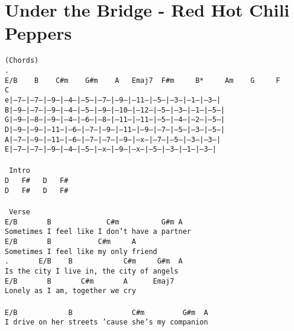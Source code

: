\newpage
\section{Under the Bridge - Red Hot Chili Peppers}
\label{Under the Bridge - Red Hot Chili Peppers}
\texttt{(Chords)\\
. E/B\ \ \ \ B\ \ \ \ C\#m\ \ \ \ G\#m\ \ \ \ A\ \ \ Emaj7\ \ F\#m\ \ \ \ \ B*\ \ \ \ \ Am\ \ \ \ G\ \ \ \ \ F\ \ \ \ \ C\\
e|--7--|--7--|--9---|--4--|--5--|--7--|--9---|--11--|--5--|--3--|--1--|--3--|\\
B|--9--|--7--|--9---|--4--|--5--|--9--|--10--|--12--|--5--|--3--|--1--|--5--|\\
G|--9--|--8--|--9---|--4--|--6--|--8--|--11--|--11--|--5--|--4--|--2--|--5--|\\
D|--9--|--9--|--11--|--6--|--7--|--9--|--11--|--9---|--7--|--5--|--3--|--5--|\\
A|--7--|--9--|--11--|--6--|--7--|--7--|--9---|--x---|--7--|--5--|--3--|--3--|\\
E|--7--|--7--|--9---|--4--|--5--|--x--|--9---|--x---|--5--|--3--|--1--|--3--|\\
\\
\lbrack\ Intro\rbrack\\
D\ \ \ F\#\ \ \ D\ \ \ F\#\\
D\ \ \ F\#\ \ \ D\ \ \ F\#\\
\\
\lbrack\ Verse\rbrack\\
E/B\ \ \ \ \ \ \ B\ \ \ \ \ \ \ \ \ \ \ \ \ C\#m\ \ \ \ \ \ \ \ \ \ G\#m\ A\\
Sometimes\ I\ feel\ like\ I\ don't\ have\ a\ partner\\
E/B\ \ \ \ \ \ \ B\ \ \ \ \ \ \ \ \ \ \ C\#m\ \ \ \ \ A\\
Sometimes\ I\ feel\ like\ my\ only\ friend\\
. \ \ \ \ \ \ E/B\ \ \ \ B\ \ \ \ \ \ \ \ \ \ \ \ C\#m\ \ \ \ \ G\#m\ \ A\\
Is\ the\ city\ I\ live\ in,\ the\ city\ of\ angels\\
E/B\ \ \ \ \ \ \ B\ \ \ \ \ \ \ C\#m\ \ \ \ \ \ \ A\ \ \ \ \ \ Emaj7\\
Lonely\ as\ I\ am,\ together\ we\ cry\\
\\
E/B\ \ \ \ \ \ \ \ \ \ \ \ B\ \ \ \ \ \ \ \ \ \ \ \ \ \ C\#m\ \ \ \ \ \ \ \ \ G\#m\ \ A\\
I\ drive\ on\ her\ streets\ 'cause\ she's\ my\ companion\\
}
